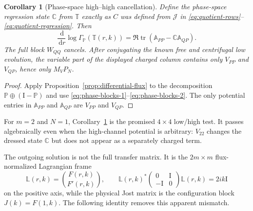 \documentclass[11pt]{article}
\newcommand{\Id}{\mathrm I}
\newcommand{\dd}{\,\mathrm d}
\DeclareMathOperator{\tr}{tr}
\newtheorem{corollary}[theorem]{Corollary}
\theoremstyle{definition}
\theoremstyle{remark}
\begin{document}
\begin{corollary}[Phase-space high--high cancellation]\label{cor:phase-flux}
Define the phase-space regression state $\mathbb C$ from $\mathbb T$ exactly
as $C$ was defined from $\mathcal J$ in
\eqref{eq:quotient-rows}--\eqref{eq:quotient-regression}.  Then
\begin{equation}
 \frac{\dd}{\dd r}\log\Gamma_{\mathbb P}(\mathbb T(r,k))
 =\Re\tr\!\left(
   \mathbb A_{PP}-\mathbb C\mathbb A_{QP}
  \right).
 \label{eq:phase-Grassmannian-flux}
\end{equation}
The full block $W_{QQ}$ cancels.  After conjugating the known free and
centrifugal low evolution, the variable part of the displayed charged column
contains only $V_{PP}$ and $V_{QP}$, hence only $M_VP_N$.
\end{corollary}

\begin{proof}
Apply Proposition~\ref{prop:differential-flux} to the decomposition
$\mathbb P\oplus(\Id-\mathbb P)$ and use
\eqref{eq:phase-blocks-1}--\eqref{eq:phase-blocks-2}.  The only potential
entries in $\mathbb A_{PP}$ and $\mathbb A_{QP}$ are $V_{PP}$ and $V_{QP}$.
\end{proof}

For $m=2$ and $N=1$, Corollary~\ref{cor:phase-flux} is the promised
$4\times4$ low/high test.  It passes algebraically even when the high-channel
potential is arbitrary: $V_{22}$ changes the dressed state $\mathbb C$ but
does not appear as a separately charged term.

The outgoing solution is not the full transfer matrix.  It is the
$2m\times m$ flux-normalized Lagrangian frame
\begin{equation}
 \mathbb L(r,k)=\binom{F(r,k)}{F'(r,k)},
 \qquad
 \mathbb L(r,k)^*
 \begin{pmatrix}0&\Id\\-\Id&0\end{pmatrix}
 \mathbb L(r,k)=2ik\Id
 \label{eq:outgoing-Lagrangian-frame}
\end{equation}
on the positive axis, while the physical Jost matrix is the configuration
block $J(k)=F(1,k)$.  The following identity removes this apparent mismatch.
\end{document}
